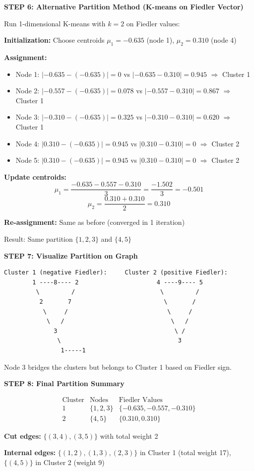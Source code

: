 \documentclass[12pt]{article}
\begin{document}
\begin{solution}
\textbf{STEP 6: Alternative Partition Method (K-means on Fiedler Vector)}

Run 1-dimensional K-means with $k=2$ on Fiedler values:

\textbf{Initialization:} Choose centroids $\mu_1 = -0.635$ (node 1), $\mu_2 = 0.310$ (node 4)

\textbf{Assignment:}
\begin{itemize}
    \item Node 1: $|-0.635 - (-0.635)| = 0$ vs $|-0.635 - 0.310| = 0.945$ $\Rightarrow$ Cluster 1
    \item Node 2: $|-0.557 - (-0.635)| = 0.078$ vs $|-0.557 - 0.310| = 0.867$ $\Rightarrow$ Cluster 1
    \item Node 3: $|-0.310 - (-0.635)| = 0.325$ vs $|-0.310 - 0.310| = 0.620$ $\Rightarrow$ Cluster 1
    \item Node 4: $|0.310 - (-0.635)| = 0.945$ vs $|0.310 - 0.310| = 0$ $\Rightarrow$ Cluster 2
    \item Node 5: $|0.310 - (-0.635)| = 0.945$ vs $|0.310 - 0.310| = 0$ $\Rightarrow$ Cluster 2
\end{itemize}

\textbf{Update centroids:}
\[
\mu_1 = \frac{-0.635 - 0.557 - 0.310}{3} = \frac{-1.502}{3} = -0.501
\]
\[
\mu_2 = \frac{0.310 + 0.310}{2} = 0.310
\]

\textbf{Re-assignment:} Same as before (converged in 1 iteration)

Result: Same partition $\{1, 2, 3\}$ and $\{4, 5\}$

\textbf{STEP 7: Visualize Partition on Graph}

\begin{verbatim}
Cluster 1 (negative Fiedler):     Cluster 2 (positive Fiedler):
        1 ----8---- 2                      4 ----9---- 5
         \         /                        \         /
          2       7                          \       /
           \     /                            \     /
            \   /                              \   /
              3                                 \ /
               \                                 3
                1-----1
\end{verbatim}

Node 3 bridges the clusters but belongs to Cluster 1 based on Fiedler sign.

\textbf{STEP 8: Final Partition Summary}

\[
\boxed{
\begin{array}{c|c|c}
\text{Cluster} & \text{Nodes} & \text{Fiedler Values} \\
\hline
1 & \{1, 2, 3\} & \{-0.635, -0.557, -0.310\} \\
2 & \{4, 5\} & \{0.310, 0.310\}
\end{array}
}
\]

\textbf{Cut edges:} $\{(3,4), (3,5)\}$ with total weight 2

\textbf{Internal edges:} $\{(1,2), (1,3), (2,3)\}$ in Cluster 1 (total weight 17), $\{(4,5)\}$ in Cluster 2 (weight 9)

\end{solution}
\end{document}
